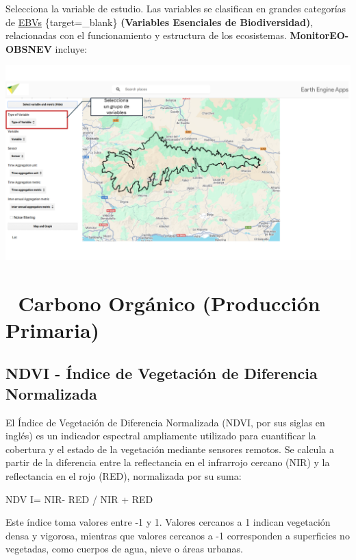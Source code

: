 \documentclass[
]{book}
\begin{document}
Selecciona la variable de estudio. Las variables se clasifican en grandes categorías de \href{https://geobon.org/ebvs/what-are-ebvs/}{EBVs} \{target=\_blank\} \textbf{(Variables Esenciales de Biodiversidad)}, relacionadas con el funcionamiento y estructura de los ecosistemas. \textbf{MonitorEO-OBSNEV} incluye:

\includegraphics{assets/variables_es.png}

\section{\texorpdfstring{\textbf{🌱 Carbono Orgánico (Producción Primaria)}}{🌱 Carbono Orgánico (Producción Primaria)}}\label{carbono-orguxe1nico-producciuxf3n-primaria}

\subsection{\texorpdfstring{\textbf{NDVI} - Índice de Vegetación de Diferencia Normalizada}{NDVI - Índice de Vegetación de Diferencia Normalizada}}\label{ndvi---uxedndice-de-vegetaciuxf3n-de-diferencia-normalizada}

El Índice de Vegetación de Diferencia Normalizada (NDVI, por sus siglas en inglés) es un indicador espectral ampliamente utilizado para cuantificar la cobertura y el estado de la vegetación mediante sensores remotos. Se calcula a partir de la diferencia entre la reflectancia en el infrarrojo cercano (NIR) y la reflectancia en el rojo (RED), normalizada por su suma:

NDV I= NIR- RED / NIR + RED

Este índice toma valores entre -1 y 1. Valores cercanos a 1 indican vegetación densa y vigorosa, mientras que valores cercanos a -1 corresponden a superficies no vegetadas, como cuerpos de agua, nieve o áreas urbanas.
\end{document}
